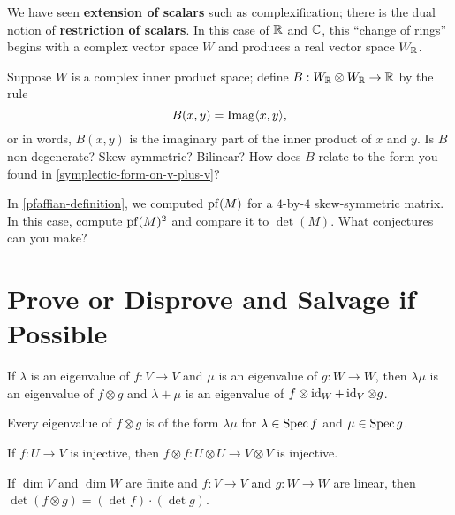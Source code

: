 \documentclass{homework}
\begin{document}
\begin{problem}
  We have seen \textbf{extension of scalars} such as complexification; there is the dual notion  of \textbf{restriction of scalars}.  In this case of $\mathbb{R}$ and $\mathbb{C}$, this ``change of rings'' begins with a complex vector space $W$ and produces a real vector space $W_{\mathbb{R}}$.
  
  Suppose $W$ is a complex inner product space; define $B : W_{\mathbb{R}} \otimes W_{\mathbb{R}} \to \mathbb{R}$ by the rule
  \[
    B(x,y) = \operatorname{Imag} \langle x, y \rangle,
  \]
  or in words, $B(x,y)$ is the imaginary part of the inner product of $x$ and $y$.   Is $B$ non-degenerate?  Skew-symmetric?  Bilinear?  How does $B$ relate to the form you found in \ref{symplectic-form-on-v-plus-v}?
\end{problem}

\begin{problem}
  In \ref{pfaffian-definition}, we computed $\operatorname{pf}(M)$ for a $4$-by-$4$
  skew-symmetric matrix.  In this case, compute $\operatorname{pf}(M)^2$ and compare
  it to $\det(M)$.  What conjectures can you make?
\end{problem}

\section{Prove or Disprove and Salvage if Possible}

\begin{problem}\label{spectrum-of-tensor}If $\lambda$ is an eigenvalue of $f : V \to V$ and $\mu$ is an
  eigenvalue of $g : W \to W$, then $\lambda \mu$ is an eigenvalue of
  $f \otimes g$ and $\lambda + \mu$ is an eigenvalue of $f \otimes \operatorname{id}_W + \operatorname{id}_V \otimes g$.
\end{problem}

\begin{problem}
  Every eigenvalue of $f \otimes g$ is of the form $\lambda \mu$ for
  $\lambda \in \operatorname{Spec} f$ and $\mu \in \operatorname{Spec} g$.
\end{problem}

\begin{problem}
  If $f : U \to V$ is injective, then $f \otimes f : U \otimes U \to V \otimes V$ is injective.
\end{problem}

\begin{problem}
  If $\dim V$ and $\dim W$ are finite and $f : V \to V$ and $g : W \to W$ are linear, then $\det (f \otimes g) = (\det f) \cdot (\det g)$.
\end{problem}
\end{document}
